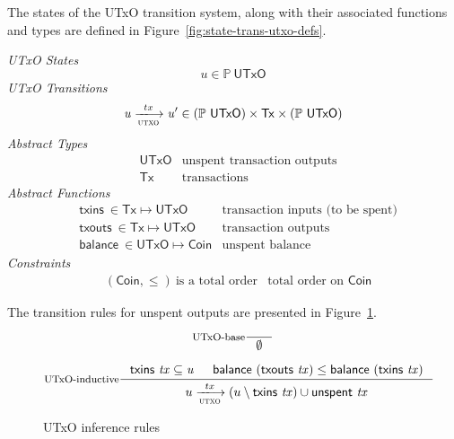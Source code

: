 \documentclass[11pt,a4paper]{article}
\newcommand{\powerset}[1]{\mathbb{P}~#1}
\newcommand{\var}[1]{\mathit{#1}}
\newcommand{\fun}[1]{\mathsf{#1}}
\newcommand{\type}[1]{\mathsf{#1}}
\newcommand{\trans}[2]{\xlongrightarrow[\textsc{#1}]{#2}}
\newcommand{\nextdef}{\\[1em]}
\newcommand{\Tx}{\type{Tx}}
\newcommand{\UTxO}{\type{UTxO}}
\newcommand{\Coin}{\type{Coin}}
\newcommand{\txins}[1]{\fun{txins}\ \var{#1}}
\newcommand{\txouts}[1]{\fun{txouts}\ \var{#1}}
\newcommand{\balance}[1]{\fun{balance}\ \var{#1}}
\newcommand{\unspent}[1]{\fun{unspent}\ \var{#1}}
\begin{document}
The states of the UTxO transition system, along with their associated functions
and types are defined in Figure~\ref{fig:state-trans-utxo-defs}.
\begin{figure*}[h]
  \emph{UTxO States}
  \begin{equation*}
    \var{u} \in \powerset{\UTxO}
  \end{equation*}
  \emph{UTxO Transitions}
  \begin{equation*}
    \var{u} \trans{utxo}{tx} \var{u'}
    \in (\powerset{\UTxO}) \times \Tx \times (\powerset{\UTxO})
  \end{equation*}
  \emph{Abstract Types}
  \begin{align*}
    & \type{UTxO} & \text{unspent transaction outputs}
    \nextdef
    & \type{Tx} & \text{transactions}
  \end{align*}
  \emph{Abstract Functions}
  \begin{align*}
    & \txins{} \in \Tx \mapsto \UTxO & \text{transaction inputs (to be spent)}
    \nextdef
    & \txouts{} \in \Tx \mapsto \UTxO & \text{transaction outputs}
    \nextdef
    & \balance{} \in \UTxO \mapsto \Coin & \text{unspent balance}
  \end{align*}
  \emph{Constraints}
  \begin{align*}
    & (\Coin, \leq)~\text{is a total order} & \text{total order on }\Coin
  \end{align*}
  \caption{Definitions associated to the UTxO transition system}
  \label{fig:state-trans-utxo-defs}
\end{figure*}

The transition rules for unspent outputs are presented in Figure~\ref{fig:state-trans-utxo}.

\begin{figure}[h]

  \centering
  \begin{equation}\label{eq:utxo-base}
    \inference[UTxO-base]
    {}
    {\emptyset}
  \end{equation}

  \begin{equation}\label{eq:utxo-inductive}
    \inference[UTxO-inductive]
    { \txins{tx} \subseteq \mathit{u}
      & \balance{(\txouts{tx})} \leq \balance{(\txins{tx})}
    }
    {u \trans{utxo}{tx} (u \setminus \txins{tx}) \cup \unspent{tx}}
  \end{equation}
  \caption{UTxO inference rules}
  \label{fig:state-trans-utxo}
\end{figure}
\end{document}
